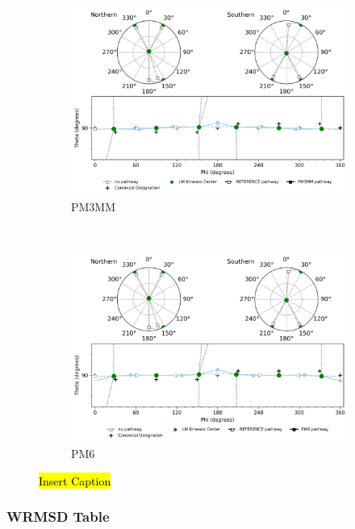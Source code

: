\documentclass{article}
\begin{document}
\begin{figure}[H]\ContinuedFloat
	\centering
	\begin{subfigure}[b]{0.48\textwidth}
		\includegraphics[width=1\textwidth,keepaspectratio]
		{figures/oxane/all_groups/z_dataset-oxane-TS--all_groups_comp-PM3MM.png}
		\caption{PM3MM}
	\end{subfigure}
	~
	\begin{subfigure}[b]{0.48\textwidth}
		\includegraphics[width=1\textwidth,keepaspectratio]
		{figures/oxane/all_groups/z_dataset-oxane-TS--all_groups_comp-PM6.png}
		\caption{PM6}
	\end{subfigure}
	\caption{\hl{Insert Caption}}
	\label{fig:oxane-ALL-LM}
\end{figure}

\subsubsection{WRMSD Table}
\end{document}
